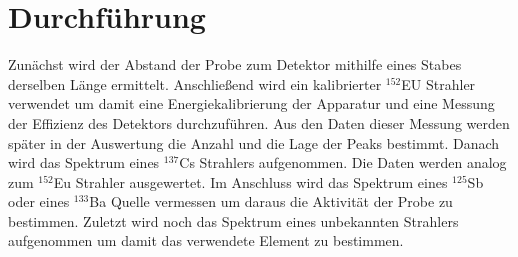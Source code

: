 
\section{Durchführung}
\label{sec:Durchführung}
Zunächst wird der Abstand der Probe zum Detektor mithilfe eines Stabes derselben Länge ermittelt. Anschließend wird ein kalibrierter $^{152}$EU Strahler verwendet um damit eine Energiekalibrierung der Apparatur und eine Messung der Effizienz des Detektors durchzuführen. Aus den Daten dieser Messung werden später in der Auswertung die Anzahl und die Lage der Peaks bestimmt. Danach wird das Spektrum eines $^{137}$Cs Strahlers aufgenommen. Die Daten werden analog zum $^{152}$Eu Strahler ausgewertet. Im Anschluss wird das Spektrum eines $^{125}$Sb oder eines $^{133}$Ba Quelle vermessen um daraus die Aktivität der Probe zu bestimmen. Zuletzt wird noch das Spektrum eines unbekannten Strahlers aufgenommen um damit das verwendete Element zu bestimmen.